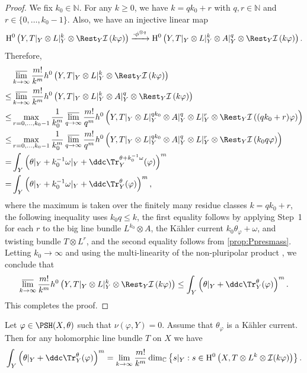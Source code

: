 \begin{proof}
We fix $k_0 \in \mathbb{N}$. For any $k \geq 0$, we have $k = q k_0 + r$ with $q,r \in \mathbb{N}$ and $r \in \{0,\ldots, k_0-1\}$. Also, we have an injective linear map
\[
\mathrm{H}^0\left(Y,T|_Y \otimes L|_Y^k \otimes \Rest_Y\mathcal{I}\left(k \varphi\right)\right)\xrightarrow{\cdot \phi^{\otimes q}} \mathrm{H}^0\left(Y,T|_Y\otimes L|_Y^k \otimes A|_Y^q \otimes \Rest_Y\mathcal{I}\left(k \varphi\right)\right).
\]
Therefore,
\[
\begin{aligned}
 &\varlimsup_{k\to\infty} \frac{m!}{k^m} h^0\left(Y,T|_Y \otimes L|_Y^k \otimes \Rest_Y\mathcal{I}\left(k\varphi\right)\right)  \\
 \leq & \varlimsup_{k\to\infty} \frac{m!}{k^m} h^0\left(Y,T|_Y \otimes L|_Y^k \otimes A|_Y^q\otimes \Rest_Y\mathcal{I}\left(k\varphi\right)\right) \\
 \leq & \max_{r=0,\ldots,k_0-1}\frac{1}{k_0^m} \varlimsup_{q\to\infty} \frac{m!}{q^m} h^0\left(Y,T|_Y\otimes L|_Y^{q k_0} \otimes A|_Y^q\otimes L|_Y^{r}\otimes \Rest_Y\mathcal{I}\left((qk_0+r)\varphi\right)\right)\\
 \leq & \max_{r=0,\ldots,k_0-1}\frac{1}{k_0^m} \varlimsup_{q\to\infty} \frac{m!}{q^m} h^0\left(Y,T|_Y\otimes L|_Y^{q k_0} \otimes A|_Y^q\otimes L|_Y^{r}\otimes \Rest_Y\mathcal{I}\left(k_0q \varphi\right)\right)\\
 = & \int_Y \left(\theta|_Y+k_0^{-1}\omega|_Y+\ddc \Tr_Y^{\theta+k_0^{-1}\omega}(\varphi)\right)^m\\
 =& \int_Y \left(\theta|_Y+k_0^{-1}\omega|_Y+\ddc \Tr_Y^{\theta}(\varphi)\right)^m,
 \end{aligned}
\]
where the maximum is taken over the finitely many residue classes $k=qk_0+r$, the following inequality uses $k_0q\leq k$, the first equality follows by applying Step~1 for each $r$ to the big line bundle $L^{k_0} \otimes A$, the Kähler current $k_0 \theta_{\varphi} + \omega$, and twisting bundle $T \otimes L^r$, and the second equality follows from \cref{prop:Ppresmass}. Letting $k_0\to\infty$ and using the multi-linearity of the non-pluripolar product , we conclude that
\[
\varlimsup_{k\to\infty} \frac{m!}{k^m}  h^0\left(Y,T|_Y \otimes L|_Y^k \otimes \Rest_Y\mathcal{I}\left(k \varphi\right)\right)\leq \int_Y \left(\theta|_Y+\ddc \Tr_Y^{\theta}(\varphi)\right)^m.
\]
This completes the proof.
\end{proof}



\begin{theorem}\label{thm:rest_volume_2} Let $\varphi\in \PSH(X,\theta)$ such that $\nu(\varphi,Y) =0$. Assume that $\theta_{\varphi}$ is a Kähler current.
Then for any holomorphic line bundle $T$ on $X$ we have
\[
    \int_Y \left(\theta|_Y+\ddc \Tr_Y^{\theta}(\varphi)\right)^m  = \lim_{k \to \infty} \frac{m!}{k^m} \dim_{\mathbb C}\left\{ s|_Y:  s\in \mathrm{H}^0\left(X,T\otimes L^k \otimes \mathcal{I}(k\varphi)\right)\right\}.
\]
\end{theorem}

